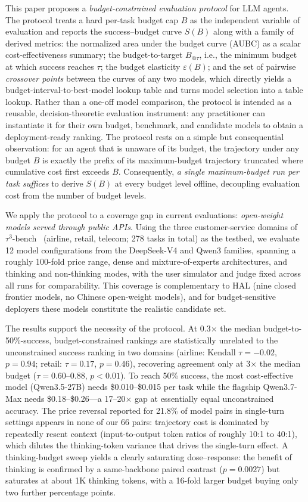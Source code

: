 \documentclass[preprint,authoryear,12pt]{elsarticle}
\begin{document}
This paper proposes a \emph{budget-constrained evaluation protocol} for LLM agents. The protocol treats a hard per-task budget cap $B$ as the independent variable of evaluation and reports the success--budget curve $S(B)$ along with a family of derived metrics: the normalized area under the budget curve (AUBC) as a scalar cost-effectiveness summary; the budget-to-target $B_{@\tau}$, i.e., the minimum budget at which success reaches $\tau$; the budget elasticity $\varepsilon(B)$; and the set of pairwise \emph{crossover points} between the curves of any two models, which directly yields a budget-interval-to-best-model lookup table and turns model selection into a table lookup. Rather than a one-off model comparison, the protocol is intended as a reusable, decision-theoretic evaluation instrument: any practitioner can instantiate it for their own budget, benchmark, and candidate models to obtain a deployment-ready ranking. The protocol rests on a simple but consequential observation: for an agent that is unaware of its budget, the trajectory under any budget $B$ is exactly the prefix of its maximum-budget trajectory truncated where cumulative cost first exceeds $B$. Consequently, \emph{a single maximum-budget run per task suffices} to derive $S(B)$ at every budget level offline, decoupling evaluation cost from the number of budget levels.

We apply the protocol to a coverage gap in current evaluations: \emph{open-weight models served through public APIs}. Using the three customer-service domains of $\tau^3$-bench~\cite{barres2025tau2bench} (airline, retail, telecom; 278 tasks in total) as the testbed, we evaluate 12 model configurations from the DeepSeek-V4 and Qwen3 families, spanning a roughly 100-fold price range, dense and mixture-of-experts architectures, and thinking and non-thinking modes, with the user simulator and judge fixed across all runs for comparability. This coverage is complementary to HAL (nine closed frontier models, no Chinese open-weight models), and for budget-sensitive deployers these models constitute the realistic candidate set.

The results support the necessity of the protocol. At 0.3$\times$ the median budget-to-50\%-success, budget-constrained rankings are statistically unrelated to the unconstrained success ranking in two domains (airline: Kendall $\tau=-0.02$, $p=0.94$; retail: $\tau=0.17$, $p=0.46$), recovering agreement only at 3$\times$ the median budget ($\tau=0.60$--$0.88$, $p<0.01$). To reach 50\% success, the most cost-effective model (Qwen3.5-27B) needs \$0.010--\$0.015 per task while the flagship Qwen3.7-Max needs \$0.18--\$0.26---a 17--20$\times$ gap at essentially equal unconstrained accuracy. The price reversal reported for 21.8\% of model pairs in single-turn settings appears in none of our 66 pairs: trajectory cost is dominated by repeatedly resent context (input-to-output token ratios of roughly 10:1 to 40:1), which dilutes the thinking-token variance that drives the single-turn effect. A thinking-budget sweep yields a clearly saturating dose--response: the benefit of thinking is confirmed by a same-backbone paired contrast ($p=0.0027$) but saturates at about 1K thinking tokens, with a 16-fold larger budget buying only two further percentage points.
\end{document}
